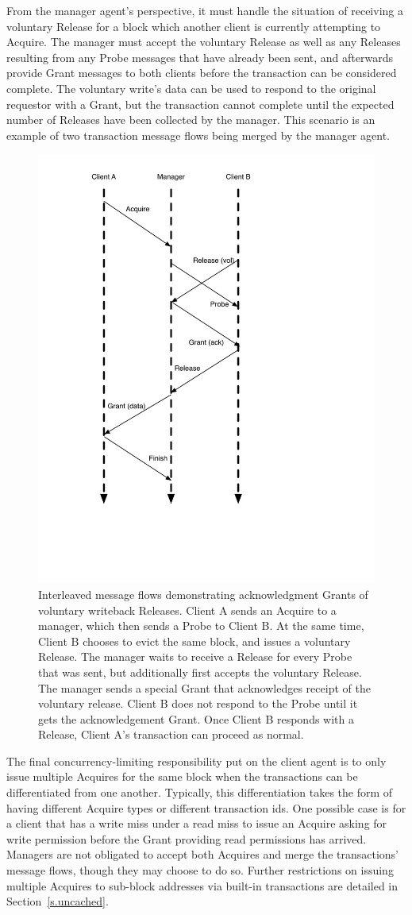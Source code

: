 From the manager agent's perspective, it must handle the situation of receiving a voluntary Release for a block which another client is currently attempting to Acquire.
The manager must accept the voluntary Release as well as any Releases resulting from any Probe messages that have already been sent, and afterwards provide Grant messages to both clients before the transaction can be considered complete.
The voluntary write's data can be used to respond to the original requestor with a Grant, but the transaction cannot complete until the expected number of Releases
have been collected by the manager.
This scenario is an example of two transaction message flows being merged by the manager agent.

\begin{figure}[t!]
\centering
\includegraphics[width=0.5\columnwidth]{tilelink/figures/rel-merge.pdf}
\caption{Interleaved message flows demonstrating acknowledgment Grants of voluntary writeback Releases.
Client A sends an Acquire to a manager, which then sends a Probe to Client B.
At the same time, Client B chooses to evict the same block, and issues a voluntary Release.
The manager waits to receive a Release for every Probe that was sent, but additionally first accepts the voluntary Release.
The manager sends a special Grant that acknowledges receipt of the voluntary release.
Client B does not respond to the Probe until it gets the acknowledgement Grant.
Once Client B responds with a Release, Client A's transaction can proceed as normal.
}
\label{fig:rel-merge}
\end{figure}

The final concurrency-limiting responsibility put on the client agent is to only issue multiple Acquires for the same block when the transactions can be differentiated from one another.
Typically, this differentiation takes the form of having different Acquire types or different transaction ids.
One possible case is for a client that has a write miss under a read miss to issue an Acquire asking for write permission before the Grant providing read permissions has arrived.
Managers are not obligated to accept both Acquires and merge the transactions' message flows, though they may choose to do so.
Further restrictions on issuing multiple Acquires to sub-block addresses via built-in transactions are detailed in Section~\ref{s.uncached}.


